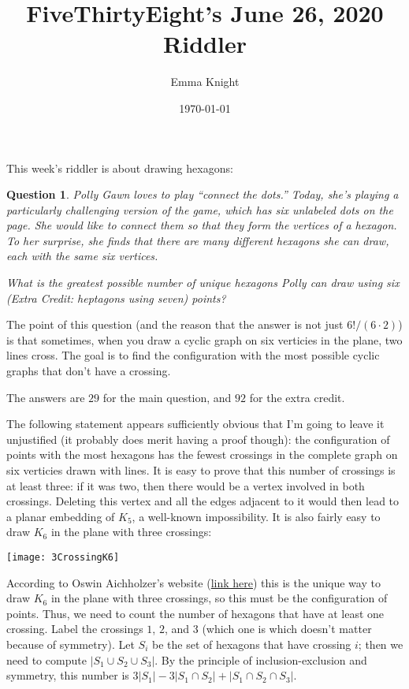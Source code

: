 \documentclass[11pt]{article}
\title{FiveThirtyEight's June 26, 2020 Riddler}
\author{Emma Knight}
\date{\today}
\newtheorem{question}[theorem]{Question}
\theoremstyle{definition}
\begin{document}
\maketitle
This week's riddler is about drawing hexagons:
\begin{question}
Polly Gawn loves to play ``connect the dots.'' Today, she's playing a particularly challenging version of the game, which has six unlabeled dots on the page. She would like to connect them so that they form the vertices of a hexagon. To her surprise, she finds that there are many different hexagons she can draw, each with the same six vertices.

What is the greatest possible number of unique hexagons Polly can draw using six (\emph{Extra Credit}: heptagons using seven) points?
\end{question}
The point of this question (and the reason that the answer is not just $6!/(6\cdot 2)$) is that sometimes, when you draw a cyclic graph on six verticies in the plane, two lines cross.  The goal is to find the configuration with the most possible cyclic graphs that don't have a crossing.

The answers are $29$ for the main question, and $92$ for the extra credit.

The following statement appears sufficiently obvious that I'm going to leave it unjustified (it probably does merit having a proof though): the configuration of points with the most hexagons has the fewest crossings in the complete graph on six verticies drawn with lines.  It is easy to prove that this number of crossings is at least three: if it was two, then there would be a vertex involved in both crossings.  Deleting this vertex and all the edges adjacent to it would then lead to a planar embedding of $K_5$, a well-known impossibility.  It is also fairly easy to draw $K_6$ in the plane with three crossings:

\texttt{[image: 3CrossingK6]}

According to Oswin Aichholzer's website (\href{http://www.ist.tugraz.at/staff/aichholzer/research/rp/triangulations/crossing/}{link here}) this is the unique way to draw $K_6$ in the plane with three crossings, so this must be the configuration of points.  Thus, we need to count the number of hexagons that have at least one crossing.  Label the crossings $1$, $2$, and $3$ (which one is which doesn't matter because of symmetry).  Let $S_i$ be the set of hexagons that have crossing $i$; then we need to compute $|S_1 \cup S_2 \cup S_3|$.  By the principle of inclusion-exclusion and symmetry, this number is $3|S_1|-3|S_1\cap S_2| + |S_1\cap S_2 \cap S_3|$.
\end{document}
